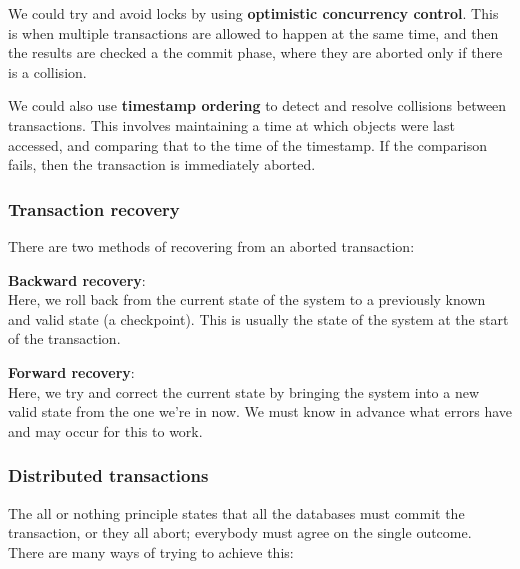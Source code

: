 We could try and avoid locks by using \textbf{optimistic concurrency control}.
This is when multiple transactions are allowed to happen at the same time, and
then the results are checked a the commit phase, where they are aborted only if
there is a collision.

We could also use \textbf{timestamp ordering} to detect and resolve collisions
between transactions. This involves maintaining a time at which objects were
last accessed, and comparing that to the time of the timestamp. If the
comparison fails, then the transaction is immediately aborted.

\subsubsection{Transaction recovery}

There are two methods of recovering from an aborted transaction:

\begin{description}
  \item \textbf{Backward recovery}:\\
    Here, we roll back from the current state of the system to a previously
    known and valid state (a checkpoint). This is usually the state of the
    system at the start of the transaction.
  \item \textbf{Forward recovery}:\\
    Here, we try and correct the current state by bringing the system into a new
    valid state from the one we're in now. We must know in advance what errors
    have and may occur for this to work.
\end{description}

\subsubsection{Distributed transactions}

The all or nothing principle states that all the databases must commit the
transaction, or they all abort; everybody must agree on the single outcome.
There are many ways of trying to achieve this:

